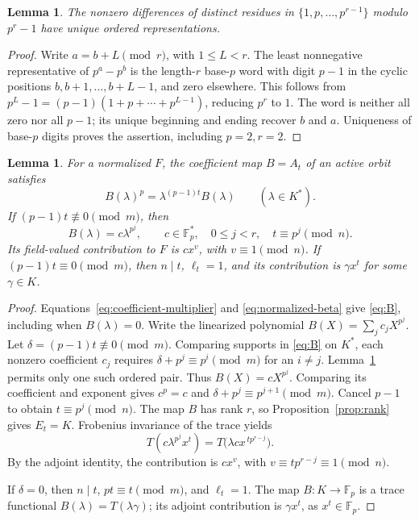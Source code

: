 \documentclass[11pt]{article}
\newtheorem{lemma}[theorem]{Lemma}
\theoremstyle{definition}
\theoremstyle{remark}
\newcommand{\Fp}{\mathbb F_p}
\numberwithin{equation}{section}
\begin{document}
\begin{lemma}\label{lem:power-differences}
The nonzero differences of distinct residues in
\(\{1,p,\ldots,p^{r-1}\}\) modulo \(p^r-1\) have unique ordered
representations.
\end{lemma}
\begin{proof}
Write \(a=b+L\pmod r\), with \(1\le L<r\).
The least nonnegative representative of \(p^a-p^b\) is the length-\(r\)
base-\(p\) word with digit \(p-1\) in the cyclic positions
\(b,b+1,\ldots,b+L-1\), and zero elsewhere. This follows from
\(p^L-1=(p-1)(1+p+\cdots+p^{L-1})\), reducing \(p^r\) to \(1\).
The word is neither all zero nor all \(p-1\); its unique beginning and
ending recover \(b\) and \(a\). Uniqueness of base-\(p\) digits proves
the assertion, including \(p=2,r=2\).
\end{proof}

\begin{lemma}\label{lem:block-form}
For a normalized \(F\), the coefficient map \(B=A_t\) of an active
orbit satisfies
\begin{equation}\label{eq:B}
 B(\lambda)^p=\lambda^{(p-1)t}B(\lambda)\qquad(\lambda\in K^*).
\end{equation}
If \((p-1)t\not\equiv0\pmod m\), then
\[
 B(\lambda)=c\lambda^{p^j},\qquad
 c\in\Fp^*,\quad 0\le j<r,\quad t\equiv p^j\pmod n.
\]
Its field-valued contribution to \(F\) is \(cx^v\), with
\(v\equiv1\pmod n\).
If \((p-1)t\equiv0\pmod m\), then \(n\mid t\), \(\ell_t=1\),
and its contribution is \(\gamma x^t\) for some \(\gamma\in K\).
\end{lemma}
\begin{proof}
Equations~\eqref{eq:coefficient-multiplier} and
\eqref{eq:normalized-beta} give \eqref{eq:B}, including when
\(B(\lambda)=0\).
Write the linearized polynomial \(B(X)=\sum_j c_jX^{p^j}\).
Let \(\delta=(p-1)t\not\equiv0\pmod m\).
Comparing supports in \eqref{eq:B} on \(K^*\), each nonzero
coefficient \(c_j\) requires
\(\delta+p^j\equiv p^i\pmod m\) for an \(i\ne j\).
Lemma~\ref{lem:power-differences} permits only one such ordered pair.
Thus \(B(X)=cX^{p^j}\).
Comparing its coefficient and exponent gives \(c^p=c\) and
\(\delta+p^j\equiv p^{j+1}\pmod m\).
Cancel \(p-1\) to obtain \(t\equiv p^j\pmod n\).
The map \(B\) has rank \(r\), so Proposition~\ref{prop:rank} gives
\(E_t=K\). Frobenius invariance of the trace yields
\[
 T(c\lambda^{p^j}x^t)
    =T\bigl(\lambda c x^{\,t p^{r-j}}\bigr).
\]
By the adjoint identity, the contribution is \(cx^v\), with
\(v\equiv t p^{r-j}\equiv1\pmod n\).

If \(\delta=0\), then \(n\mid t\), \(pt\equiv t\pmod m\), and
\(\ell_t=1\). The map \(B:K\to\Fp\) is a trace functional
\(B(\lambda)=T(\lambda\gamma)\); its adjoint contribution is
\(\gamma x^t\), as \(x^t\in\Fp\).
\end{proof}
\end{document}
